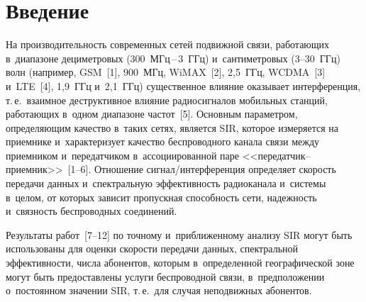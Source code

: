 

\vspace*{-3pt}



\thispagestyle{headings}

\begin{multicols}{2}

\label{st\stat}

\section{Введение}

  На производительность современных сетей подвижной связи, работающих 
в~диапазоне де\-ци\-мет\-ро\-вых (300~МГц\,--\,3~ГГц) и~сантиметровых (3--30~ГГц) 
волн (например, GSM~[1], 900~МГц, WiMAX~[2], 2,5~ГГц, WCDMA~[3] 
и~LTE~[4], 1,9~ГГц и~2,1~ГГц) существенное влияние оказывает 
интерференция, т.\,е.\ взаимное деструктивное влияние радиосигналов 
мобильных станций, ра\-бо\-та\-ющих в~одном диапазоне частот~[5]. Основным 
па\-ра\-мет\-ром, определяющим качество в~таких сетях, является SIR, которое 
измеряется на приемнике и~характеризует качество беспроводного канала связи 
между приемником и~передатчиком в~ассоциированной паре  
<<пе\-ре\-дат\-чик--при\-ем\-ник>>~[1--6]. Отношение сиг\-нал/ин\-тер\-фе\-рен\-ция определяет 
скорость передачи данных и~спектральную эффективность радиоканала 
и~системы в~целом, от которых зависит пропускная способность сети, 
надежность и~связность беспроводных соединений. 
  
  Результаты работ~[7--12] по точному и~приближенному анализу SIR могут 
быть использованы для оценки скорости передачи данных, спектральной 
эффективности, числа абонентов, которым в~определенной географической 
зоне могут быть предоставлены услуги беспроводной связи, в~предположении 
о~постоянном значении SIR, т.\,е.\ для случая неподвижных 
абонентов. 


\end{multicols}

